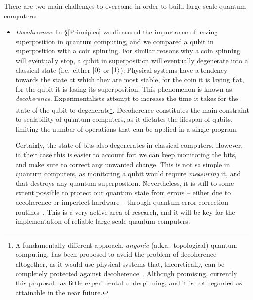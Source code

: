 There are two main challenges to overcome in order to build large scale quantum computers:

\begin{itemize}

  \item \textit{Decoherence}: In \S\ref{Principles} we discussed the importance of having superposition in quantum computing, and we compared a qubit in superposition with a coin spinning. For similar reasons why a coin spinning will eventually stop, a qubit in superposition will eventually degenerate into a classical state (i.e.\ either \(\vert 0 \rangle\) or \(\vert 1 \rangle\)): Physical systems have a tendency towards the state at which they are most stable, for the coin it is laying flat, for the qubit it is losing its superposition. This phenomenon is known as \textit{decoherence}. Experimentalists attempt to increase the time it takes for the state of the qubit to degenerate\footnote{A fundamentally different approach, \textit{anyonic} (a.k.a.\ topological) quantum computing, has been proposed to avoid the problem of decoherence altogether, as it would use physical systems that, theoretically, can be completely protected against decoherence~\citep{Anyonic}. Although promising, currently this proposal has little experimental underpinning, and it is not regarded as attainable in the near future.}. Decoherence constitutes the main constraint to scalability of quantum computers, as it dictates the lifespan of qubits, limiting the number of operations that can be applied in a single program. 

  Certainly, the state of bits also degenerates in classical computers. However, in their case this is easier to account for: we can keep monitoring the bits, and make sure to correct any unwanted change. This is not so simple in quantum computers, as monitoring a qubit would require \textit{measuring} it, and that destroys any quantum superposition. Nevertheless, it is still to some extent possible to protect our quantum state from errors -- either due to decoherence or imperfect hardware -- through quantum error correction routines~\citep{QuantumErrorCorrection}. This is a very active area of research, and it will be key for the implementation of reliable large scale quantum computers.



\end{itemize}
